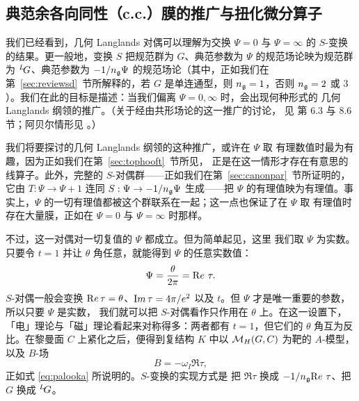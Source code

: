 
\subsection{典范余各向同性（c.c.）膜的推广与扭化微分算子}\label{sec:genotics}

我们已经看到，几何 Langlands 对偶可以理解为交换 $\Psi=0$ 与
$\Psi=\infty$ 的 $S$-变换的结果。更一般地，变换 $S$ 把规范群为
$G$、典范参数为 $\Psi$ 的规范场论映为规范群为 $\LG$、典范参数为
$-1/n_{\frak g}\Psi$ 的规范场论（其中，正如我们在
第~\ref{sec:reviewsd}~节所解释的，若 $G$ 是单连通型，则
$n_{\frak g}=1$，否则 $n_{\frak
g}=2$ 或 $3$）。我们在此的目标是描述：当我们偏离
$\Psi=0,\infty$ 时，会出现何种形式的
几何 Langlands 纲领的推广。（关于经由共形场论的这一推广的讨论，
见 \cite{ref9} 第 6.3 与 8.6 节；阿贝尔情形见 \cite{ref146}。）

我们将要探讨的几何 Langlands 纲领的这种推广，或许在 $\Psi$ 取
有理数值时最为有趣，因为正如我们在第~\ref{sec:tophooft}~节所见，
正是在这一情形才存在有意思的线算子。此外，完整的
$S$-对偶群——正如我们在第~\ref{sec:canonpar}~节所证明的，它由
$T:\Psi\to\Psi+1$ 连同 $S:\Psi\to -1/n_{\frak
g}\Psi$ 生成——把 $\Psi$ 的有理值映为有理值。事实上，$\Psi$
的一切有理值都被这个群联系在一起；这一点也保证了在 $\Psi$ 取
有理值时存在大量膜，正如在 $\Psi=0$ 与 $\Psi=\infty$ 时那样。

不过，这一对偶对一切复值的 $\Psi$ 都成立。但为简单起见，这里
我们取 $\Psi$ 为实数。只要令 $t=1$ 并让 $\theta$ 角任意，就能得到
$\Psi$ 的任意实数值： %
\setcounter{equation}{25}
\begin{equation}\label{eq:melo}
\Psi={\theta\over
{2\pi}}=\Re\tau.
\end{equation}
 $S$-对偶一般会变换 ${\rm
Re}\,\tau=\theta$、${\rm Im}\,\tau=4\pi/e^2$ 以及 $t$。但 $\Psi$
才是唯一重要的参数，所以只要 $\Psi$ 是实数，
我们就可以把 $S$-对偶看作只作用在 $\theta$ 上。在这一设置下，
「电」理论与「磁」理论看起来对称得多：两者都有 $t=1$，但它们的
$\theta$ 角互为反比。在黎曼面 $C$ 上紧化之后，便得到复结构 $K$
中以 $\MH(G,C)$ 为靶的 $A$-模型，以及 $B$-场 %
\setcounter{equation}{26}
\begin{equation}\label{eq:pelbo}
B=-\omega_I \Re\tau,
\end{equation}
 正如式 \eqref{eq:palooka} 所说明的。$S$-变换的实现方式是
把 $\Re\tau$ 换成 $-1/n_{\frak g}\Re\tau$、把 $G$ 换成
$^L\negthinspace G$。

